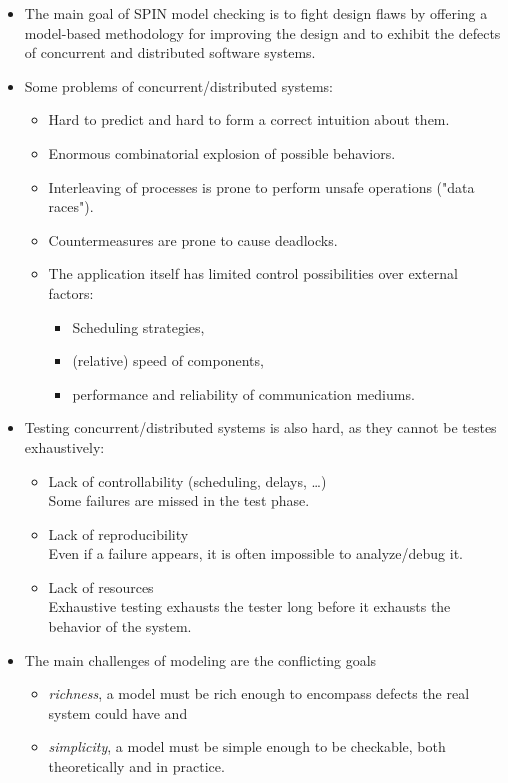 \documentclass[a4paper, 11pt, accentcolor = tud3b]{tudreport}
\begin{document}
		\begin{itemize}
			\item The main goal of SPIN model checking is to fight design flaws by offering a model-based methodology for improving the design and to exhibit the defects of concurrent and distributed software systems.
			\item Some problems of concurrent/distributed systems:
				\begin{itemize}
					\item Hard to predict and hard to form a correct intuition about them.
					\item Enormous combinatorial explosion of possible behaviors.
					\item Interleaving of processes is prone to perform unsafe operations ("data races").
					\item Countermeasures are prone to cause deadlocks.
					\item The application itself has limited control possibilities over external factors:
						\begin{itemize}
							\item Scheduling strategies,
							\item (relative) speed of components,
							\item performance and reliability of communication mediums.
						\end{itemize}
				\end{itemize}
			\item Testing concurrent/distributed systems is also hard, as they cannot be testes exhaustively:
				\begin{itemize}
					\item Lack of controllability (scheduling, delays, \dots) \\
					Some failures are missed in the test phase.
					\item Lack of reproducibility \\
					Even if a failure appears, it is often impossible to analyze/debug it.
					\item Lack of resources \\
					Exhaustive testing exhausts the tester long before it exhausts the behavior of the system.
				\end{itemize}
			\item The main challenges of modeling are the conflicting goals
				\begin{itemize}
					\item \textit{richness}, a model must be rich enough to encompass defects the real system could have and
					\item \textit{simplicity}, a model must be simple enough to be checkable, both theoretically and in practice.
				\end{itemize}
		\end{itemize}
\end{document}
